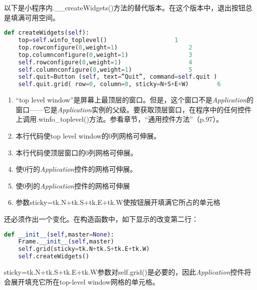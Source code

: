 以下是小程序内.\_\_createWidgets()方法的替代版本。在这个版本中，退出按钮总是填满可用空间。
\begin{lstlisting}[language=python]
def createWidgets(self):
	top=self.winfo_toplevel()					1
	top.rowconfigure(0,weight=1)	   				2
	top.columnconfigure(0,weight=1)					3
	self.rowconfigure(0,weight=1)					4
	self.columnconfigure(0,weight=1)				5
	self.quit=Button (self, text=”Quit”, command=self.quit )
	self.quit.grid( row=0, column=0, sticky=N+S+E+W)		6
\end{lstlisting}
\begin{enumerate}
\item “top level window''是屏幕上最顶层的窗口。但是，这个窗口不是\textit{Application}的窗口——它是\textit{Application}实例的父级。要获取顶层窗口，在程序中的任何控件上调用.winfo\_toplevel()方法。参看章节，“通用控件方法”（p.97）。
\item 本行代码使top level window的0列网格可伸展。 
\item 本行代码使顶层窗口的0列网格可伸展。
\item 使0行的\textit{Application}控件的网格可伸展。
\item 使0列的\textit{Application}控件的网格可伸展
\item 参数sticky=tk.N+tk.S+tk.E+tk.W使按钮展开填满它所占的单元格
\end{enumerate}
还必须作出一个变化。在构造函数中，如下显示的改变第二行：
\begin{lstlisting}[language=python]
def __init__(self,master=None):
	Frame.__init__(self,master)
	self.grid(sticky=tk.N+tk.S+tk.E+tk.W)
	self.createWidgets()
\end{lstlisting}
sticky=tk.N+tk.S+tk.E+tk.W参数对self.grid()是必要的，因此\textit{Application}控件将会展开填充它所在top-level window网格的单元格。

